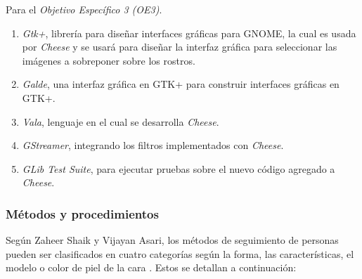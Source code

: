 \documentclass[a4paper,openright,12pt]{report}
\begin{document}
Para el \textit{Objetivo Específico 3 (OE3)}.\\
\begin{enumerate}
    \item \textit{Gtk+}, librería para diseñar interfaces gráficas para GNOME,
        la cual es usada por \textit{Cheese} y se usará para diseñar la
        interfaz gráfica para seleccionar las imágenes a sobreponer sobre
        los rostros.
    \item \textit{Galde}, una interfaz gráfica en GTK+ para construir interfaces
        gráficas en GTK+.
    \item \textit{Vala}, lenguaje en el cual se desarrolla \textit{Cheese}.
    \item \textit{GStreamer}, integrando los filtros implementados con
        \textit{Cheese}.
    \item \textit{GLib Test Suite}, para ejecutar pruebas sobre el nuevo código
        agregado a \textit{Cheese}.
\end{enumerate}

\subsubsection{Métodos y procedimientos}
Según Zaheer Shaik y Vijayan Asari, los métodos de seguimiento de personas
pueden ser clasificados en cuatro categorías según la forma, las características,
el modelo o color de piel de la cara \cite{shaik2007robust}. Estos se detallan
a continuación:
\end{document}
